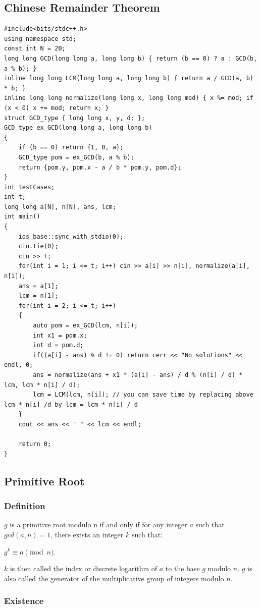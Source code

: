 \documentclass[8pt, a4paper, oneside, twocolumn]{extarticle}
\begin{document}
\subsection{Chinese Remainder Theorem}
\begin{verbatim}
#include<bits/stdc++.h>
using namespace std;
const int N = 20;
long long GCD(long long a, long long b) { return (b == 0) ? a : GCD(b, a % b); }
inline long long LCM(long long a, long long b) { return a / GCD(a, b) * b; }
inline long long normalize(long long x, long long mod) { x %= mod; if (x < 0) x += mod; return x; }
struct GCD_type { long long x, y, d; };
GCD_type ex_GCD(long long a, long long b)
{
    if (b == 0) return {1, 0, a};
    GCD_type pom = ex_GCD(b, a % b);
    return {pom.y, pom.x - a / b * pom.y, pom.d};
}
int testCases;
int t;
long long a[N], n[N], ans, lcm;
int main()
{
    ios_base::sync_with_stdio(0);
    cin.tie(0);
    cin >> t;
    for(int i = 1; i <= t; i++) cin >> a[i] >> n[i], normalize(a[i], n[i]);
    ans = a[1];
    lcm = n[1];
    for(int i = 2; i <= t; i++)
    {
        auto pom = ex_GCD(lcm, n[i]);
        int x1 = pom.x;
        int d = pom.d;
        if((a[i] - ans) % d != 0) return cerr << "No solutions" << endl, 0;
        ans = normalize(ans + x1 * (a[i] - ans) / d % (n[i] / d) * lcm, lcm * n[i] / d);
        lcm = LCM(lcm, n[i]); // you can save time by replacing above lcm * n[i] /d by lcm = lcm * n[i] / d
    }
    cout << ans << " " << lcm << endl;
 
    return 0;
}
\end{verbatim}
\subsection{Primitive Root}
\subsubsection{Definition}
$g$ is a primitive root modulo n if and only if for any integer $a$ such that $gcd(a, n) = 1$, there exists an integer $k$ such that:

$g^k \equiv a \pmod n$.

$k$ is then called the index or discrete logarithm of $a$ to the base $g$ modulo $n$. $g$ is also called the generator of the multiplicative group of integers modulo $n$.

\subsubsection{Existence}
\end{document}
